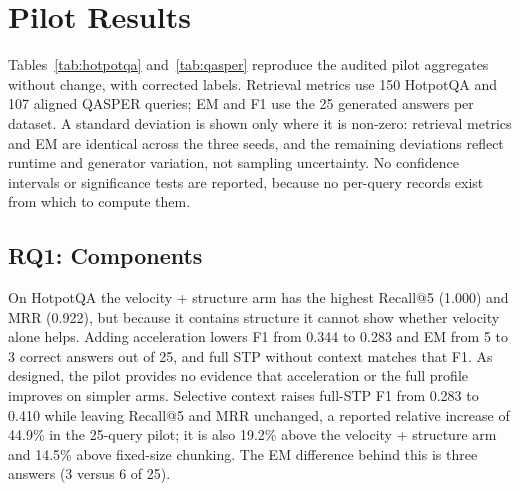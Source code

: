\documentclass[10pt,a4paper]{article}
\begin{document}
\FloatBarrier
\section{Pilot Results}
\label{sec:results}

Tables~\ref{tab:hotpotqa} and~\ref{tab:qasper} reproduce the audited pilot aggregates without change, with corrected labels. Retrieval metrics use 150 HotpotQA and 107 aligned QASPER queries; EM and F1 use the 25 generated answers per dataset. A standard deviation is shown only where it is non-zero: retrieval metrics and EM are identical across the three seeds, and the remaining deviations reflect runtime and generator variation, not sampling uncertainty. No confidence intervals or significance tests are reported, because no per-query records exist from which to compute them.

\begin{table}[!htbp]
\caption{Pilot aggregates on HotpotQA. EM shows the number of exact answers out of 25 in parentheses. Bold marks the highest value in each quality column, including ties. $^\dagger$Legacy label \texttt{velocity\_only}; the structural weight is active. $^\ddagger$Legacy label \texttt{velocity\_acceleration}; structural weight and acceleration sign unverified.}
\label{tab:hotpotqa}
\centering\footnotesize
\setlength{\tabcolsep}{2pt}
\renewcommand{\arraystretch}{1.12}

\end{table}

\begin{table}[!htbp]
\caption{Pilot aggregates on QASPER. Retrieval metrics exclude the 42 of 149 questions (28.2\%) that substring alignment could not map; EM and F1 use 25 questions. Notation as in Table~\ref{tab:hotpotqa}.}
\label{tab:qasper}
\centering\footnotesize
\setlength{\tabcolsep}{2pt}
\renewcommand{\arraystretch}{1.12}

\end{table}

\subsection{RQ1: Components}
On HotpotQA the velocity + structure arm has the highest Recall@5 (1.000) and MRR (0.922), but because it contains structure it cannot show whether velocity alone helps. Adding acceleration lowers F1 from 0.344 to 0.283 and EM from 5 to 3 correct answers out of 25, and full STP without context matches that F1. As designed, the pilot provides no evidence that acceleration or the full profile improves on simpler arms. Selective context raises full-STP F1 from 0.283 to 0.410 while leaving Recall@5 and MRR unchanged, a reported relative increase of 44.9\% in the 25-query pilot; it is also 19.2\% above the velocity + structure arm and 14.5\% above fixed-size chunking. The EM difference behind this is three answers (3 versus 6 of 25).
\end{document}
